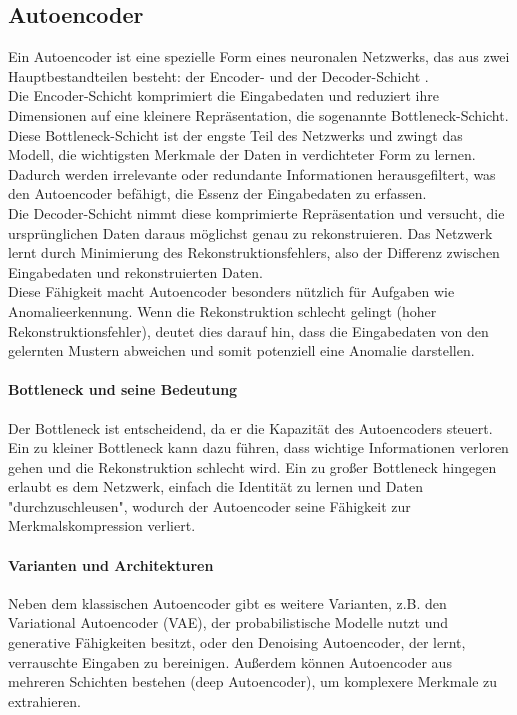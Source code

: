 \documentclass[a4paper,12pt]{article}
\begin{document}
	\subsection{Autoencoder}
	Ein Autoencoder ist eine spezielle Form eines neuronalen Netzwerks, das aus zwei Hauptbestandteilen besteht: der Encoder- und der Decoder-Schicht \cite{michelucci2022introduction}.
	\\[0.5em]
	Die Encoder-Schicht komprimiert die Eingabedaten und reduziert ihre Dimensionen auf eine kleinere Repräsentation, die sogenannte Bottleneck-Schicht. Diese Bottleneck-Schicht ist der engste Teil des Netzwerks und zwingt das Modell, die wichtigsten Merkmale der Daten in verdichteter Form zu lernen. Dadurch werden irrelevante oder redundante Informationen herausgefiltert, was den Autoencoder befähigt, die Essenz der Eingabedaten zu erfassen.
	\\[0.5em]
	Die Decoder-Schicht nimmt diese komprimierte Repräsentation und versucht, die ursprünglichen Daten daraus möglichst genau zu rekonstruieren. Das Netzwerk lernt durch Minimierung des Rekonstruktionsfehlers, also der Differenz zwischen Eingabedaten und rekonstruierten Daten.
	\\[0.5em]
	Diese Fähigkeit macht Autoencoder besonders nützlich für Aufgaben wie Anomalieerkennung. Wenn die Rekonstruktion schlecht gelingt (hoher Rekonstruktionsfehler), deutet dies darauf hin, dass die Eingabedaten von den gelernten Mustern abweichen und somit potenziell eine Anomalie darstellen.
	
	\paragraph{Bottleneck und seine Bedeutung}
	Der Bottleneck ist entscheidend, da er die Kapazität des Autoencoders steuert. Ein zu kleiner Bottleneck kann dazu führen, dass wichtige Informationen verloren gehen und die Rekonstruktion schlecht wird. Ein zu großer Bottleneck hingegen erlaubt es dem Netzwerk, einfach die Identität zu lernen und Daten "durchzuschleusen", wodurch der Autoencoder seine Fähigkeit zur Merkmalskompression verliert.
	
	\paragraph{Varianten und Architekturen}
	Neben dem klassischen Autoencoder gibt es weitere Varianten, z.B. den Variational Autoencoder (VAE), der probabilistische Modelle nutzt und generative Fähigkeiten besitzt, oder den Denoising Autoencoder, der lernt, verrauschte Eingaben zu bereinigen. Außerdem können Autoencoder aus mehreren Schichten bestehen (deep Autoencoder), um komplexere Merkmale zu extrahieren.
	
\end{document}
